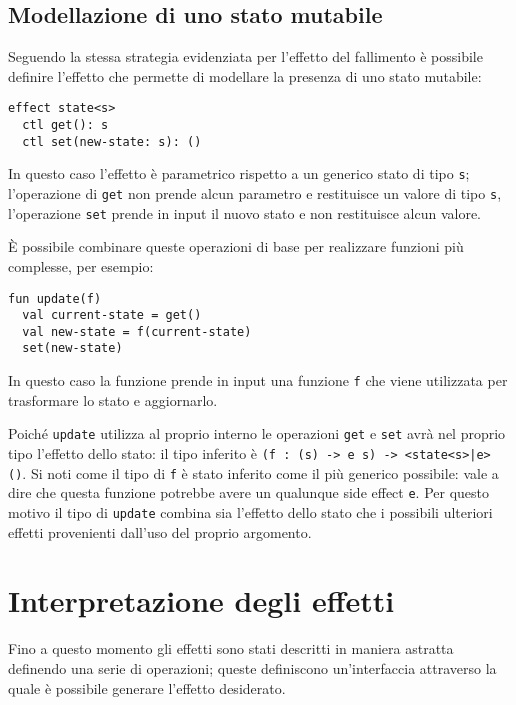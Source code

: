 \subsection{Modellazione di uno stato mutabile}
Seguendo la stessa strategia evidenziata per l'effetto del fallimento è possibile definire l'effetto che permette di modellare la presenza di uno stato mutabile:
\begin{lstlisting}[language=koka]
effect state<s>
  ctl get(): s
  ctl set(new-state: s): ()
\end{lstlisting}
In questo caso l'effetto è parametrico rispetto a un generico stato di tipo \lstinline{s}; l'operazione di \lstinline{get} non prende alcun parametro e restituisce un valore di tipo \lstinline{s}, l'operazione \lstinline{set} prende in input il nuovo stato e non restituisce alcun valore.

È possibile combinare queste operazioni di base per realizzare funzioni più complesse, per esempio:
\begin{lstlisting}[language=koka]
fun update(f)
  val current-state = get()
  val new-state = f(current-state)
  set(new-state)
\end{lstlisting}
In questo caso la funzione prende in input una funzione \lstinline{f} che viene utilizzata per trasformare lo stato e aggiornarlo.

Poiché \lstinline{update} utilizza al proprio interno le operazioni \lstinline{get} e \lstinline{set} avrà nel proprio tipo l'effetto dello stato: il tipo inferito è \lstinline{(f : (s) -> e s) -> <state<s>|e> ()}.
Si noti come il tipo di \lstinline{f} è stato inferito come il più generico possibile: vale a dire che questa funzione potrebbe avere un qualunque side effect \lstinline{e}.
Per questo motivo il tipo di \lstinline{update} combina sia l'effetto dello stato che i possibili ulteriori effetti provenienti dall'uso del proprio argomento.



\section{Interpretazione degli effetti}
Fino a questo momento gli effetti sono stati descritti in maniera astratta definendo una serie di operazioni; queste definiscono un'interfaccia attraverso la quale è possibile generare l'effetto desiderato.

